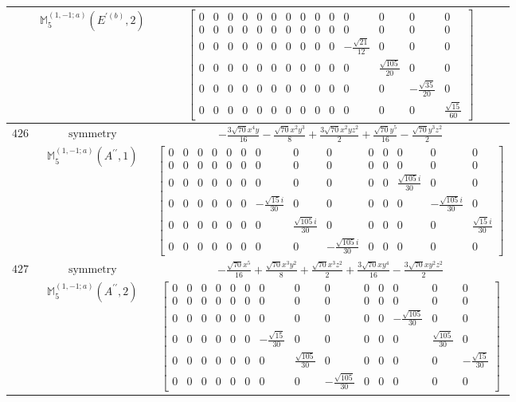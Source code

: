\documentclass[fleqn,8pt,landscape]{jsarticle}
\begin{document}
\begin{longtable}{ccc}
$  $ & $ \mathbb{M}_{5}^{(1,-1;a)}(E^{\prime(b)},2) $ & $ \begin{bmatrix} 0 & 0 & 0 & 0 & 0 & 0 & 0 & 0 & 0 & 0 & 0 & 0 & 0 & 0 \\ 0 & 0 & 0 & 0 & 0 & 0 & 0 & 0 & 0 & 0 & 0 & 0 & 0 & 0 \\ 0 & 0 & 0 & 0 & 0 & 0 & 0 & 0 & 0 & 0 & - \frac{\sqrt{21}}{12} & 0 & 0 & 0 \\ 0 & 0 & 0 & 0 & 0 & 0 & 0 & 0 & 0 & 0 & 0 & \frac{\sqrt{105}}{20} & 0 & 0 \\ 0 & 0 & 0 & 0 & 0 & 0 & 0 & 0 & 0 & 0 & 0 & 0 & - \frac{\sqrt{35}}{20} & 0 \\ 0 & 0 & 0 & 0 & 0 & 0 & 0 & 0 & 0 & 0 & 0 & 0 & 0 & \frac{\sqrt{15}}{60} \end{bmatrix} $ \\ \hline
$ 426 $ & $ \text{symmetry} $ & $ - \frac{3 \sqrt{70} x^{4} y}{16} - \frac{\sqrt{70} x^{2} y^{3}}{8} + \frac{3 \sqrt{70} x^{2} y z^{2}}{2} + \frac{\sqrt{70} y^{5}}{16} - \frac{\sqrt{70} y^{3} z^{2}}{2} $ \\
$  $ & $ \mathbb{M}_{5}^{(1,-1;a)}(A^{\prime\prime},1) $ & $ \begin{bmatrix} 0 & 0 & 0 & 0 & 0 & 0 & 0 & 0 & 0 & 0 & 0 & 0 & 0 & 0 \\ 0 & 0 & 0 & 0 & 0 & 0 & 0 & 0 & 0 & 0 & 0 & 0 & 0 & 0 \\ 0 & 0 & 0 & 0 & 0 & 0 & 0 & 0 & 0 & 0 & 0 & \frac{\sqrt{105} i}{30} & 0 & 0 \\ 0 & 0 & 0 & 0 & 0 & 0 & - \frac{\sqrt{15} i}{30} & 0 & 0 & 0 & 0 & 0 & - \frac{\sqrt{105} i}{30} & 0 \\ 0 & 0 & 0 & 0 & 0 & 0 & 0 & \frac{\sqrt{105} i}{30} & 0 & 0 & 0 & 0 & 0 & \frac{\sqrt{15} i}{30} \\ 0 & 0 & 0 & 0 & 0 & 0 & 0 & 0 & - \frac{\sqrt{105} i}{30} & 0 & 0 & 0 & 0 & 0 \end{bmatrix} $ \\ \hline
$ 427 $ & $ \text{symmetry} $ & $ - \frac{\sqrt{70} x^{5}}{16} + \frac{\sqrt{70} x^{3} y^{2}}{8} + \frac{\sqrt{70} x^{3} z^{2}}{2} + \frac{3 \sqrt{70} x y^{4}}{16} - \frac{3 \sqrt{70} x y^{2} z^{2}}{2} $ \\
$  $ & $ \mathbb{M}_{5}^{(1,-1;a)}(A^{\prime\prime},2) $ & $ \begin{bmatrix} 0 & 0 & 0 & 0 & 0 & 0 & 0 & 0 & 0 & 0 & 0 & 0 & 0 & 0 \\ 0 & 0 & 0 & 0 & 0 & 0 & 0 & 0 & 0 & 0 & 0 & 0 & 0 & 0 \\ 0 & 0 & 0 & 0 & 0 & 0 & 0 & 0 & 0 & 0 & 0 & - \frac{\sqrt{105}}{30} & 0 & 0 \\ 0 & 0 & 0 & 0 & 0 & 0 & - \frac{\sqrt{15}}{30} & 0 & 0 & 0 & 0 & 0 & \frac{\sqrt{105}}{30} & 0 \\ 0 & 0 & 0 & 0 & 0 & 0 & 0 & \frac{\sqrt{105}}{30} & 0 & 0 & 0 & 0 & 0 & - \frac{\sqrt{15}}{30} \\ 0 & 0 & 0 & 0 & 0 & 0 & 0 & 0 & - \frac{\sqrt{105}}{30} & 0 & 0 & 0 & 0 & 0 \end{bmatrix} $ \\ \hline

\end{longtable}
\end{document}
